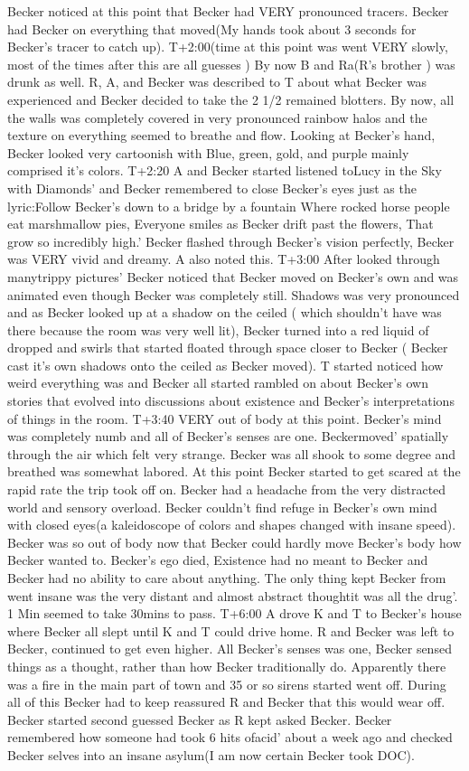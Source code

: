 \documentclass[12pt]{book}
\begin{document}
Becker noticed at this point that Becker had VERY pronounced tracers. Becker had Becker on everything that moved(My hands took about 3 seconds for Becker's tracer to catch up). T+2:00(time at this point was went VERY slowly, most of the times after this are all guesses ) By now B and Ra(R's brother ) was drunk as well. R, A, and Becker was described to T about what Becker was experienced and Becker decided to take the 2 1/2 remained blotters. By now, all the walls was completely covered in very pronounced rainbow halos and the texture on everything seemed to breathe and flow. Looking at Becker's hand, Becker looked very cartoonish with Blue, green, gold, and purple mainly comprised it's colors. T+2:20 A and Becker started listened toLucy in the Sky with Diamonds' and Becker remembered to close Becker's eyes just as the lyric:Follow Becker's down to a bridge by a fountain Where rocked horse people eat marshmallow pies, Everyone smiles as Becker drift past the flowers, That grow so incredibly high.' Becker flashed through Becker's vision perfectly, Becker was VERY vivid and dreamy. A also noted this. T+3:00 After looked through manytrippy pictures' Becker noticed that Becker moved on Becker's own and was animated even though Becker was completely still. Shadows was very pronounced and as Becker looked up at a shadow on the ceiled ( which shouldn't have was there because the room was very well lit), Becker turned into a red liquid of dropped and swirls that started floated through space closer to Becker ( Becker cast it's own shadows onto the ceiled as Becker moved). T started noticed how weird everything was and Becker all started rambled on about Becker's own stories that evolved into discussions about existence and Becker's interpretations of things in the room. T+3:40 VERY out of body at this point. Becker's mind was completely numb and all of Becker's senses are one. Beckermoved' spatially through the air which felt very strange. Becker was all shook to some degree and breathed was somewhat labored. At this point Becker started to get scared at the rapid rate the trip took off on. Becker had a headache from the very distracted world and sensory overload. Becker couldn't find refuge in Becker's own mind with closed eyes(a kaleidoscope of colors and shapes changed with insane speed). Becker was so out of body now that Becker could hardly move Becker's body how Becker wanted to. Becker's ego died, Existence had no meant to Becker and Becker had no ability to care about anything. The only thing kept Becker from went insane was the very distant and almost abstract thoughtit was all the drug'. 1 Min seemed to take 30mins to pass. T+6:00 A drove K and T to Becker's house where Becker all slept until K and T could drive home. R and Becker was left to Becker, continued to get even higher. All Becker's senses was one, Becker sensed things as a thought, rather than how Becker traditionally do. Apparently there was a fire in the main part of town and 35 or so sirens started went off. During all of this Becker had to keep reassured R and Becker that this would wear off. Becker started second guessed Becker as R kept asked Becker. Becker remembered how someone had took 6 hits ofacid' about a week ago and checked Becker selves into an insane asylum(I am now certain Becker took DOC). 
\end{document}
